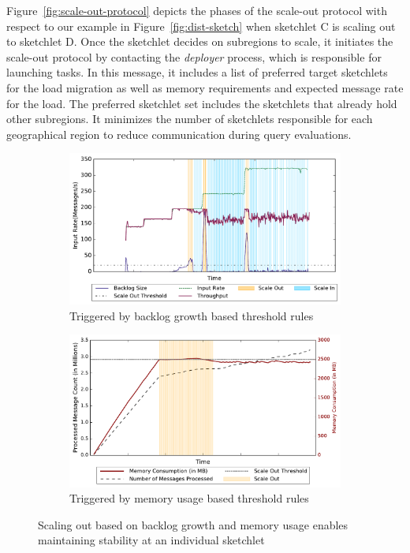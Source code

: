 Figure~\ref{fig:scale-out-protocol} depicts the phases of the scale-out protocol with respect to our example in Figure~\ref{fig:dist-sketch} when sketchlet C is scaling out to sketchlet D.
Once the sketchlet decides on subregions to scale, it initiates the scale-out protocol by contacting the \emph{deployer} process, which is responsible for launching tasks.
In this message, it includes a list of preferred target sketchlets for the load migration as well as memory requirements and expected message rate for the load.
The preferred sketchlet set includes the sketchlets that already hold other subregions.
It minimizes the number of sketchlets responsible for each geographical region to reduce communication during query evaluations.
\begin{figure}[h!]
    \begin{subfigure}{0.48\textwidth}
            \centering
            \includegraphics[scale=0.42]{figures/stability_partial.pdf}
            \caption{Triggered by backlog growth based threshold rules}
            \label{fig:stability-backlog}
    \end{subfigure}
    \begin{subfigure}{0.48\textwidth}
            \centering
            \includegraphics[scale=0.42]{figures//mem_stability.pdf} 
            \caption{Triggered by memory usage based threshold rules}
            \label{fig:stability-mem}
    \end{subfigure}
    \caption{Scaling out based on backlog growth and memory usage enables maintaining stability at an individual sketchlet}
    \label{fig:system-stability}
\end{figure}
